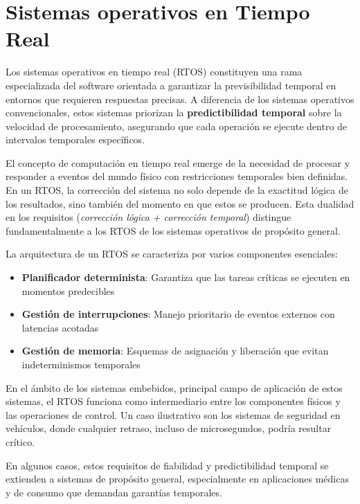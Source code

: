 \chapter{Sistemas operativos en Tiempo Real}\label{ch:real_time_oses}

Los sistemas operativos en tiempo real (RTOS) \cite{Siewert_Pratt_2016} constituyen una rama especializada del software orientada a garantizar la previsibilidad temporal en entornos que requieren respuestas precisas. A diferencia de los sistemas operativos convencionales, estos sistemas priorizan la \textbf{predictibilidad temporal} sobre la velocidad de procesamiento, asegurando que cada operación se ejecute dentro de intervalos temporales específicos.

El concepto de computación en tiempo real emerge de la necesidad de procesar y responder a eventos del mundo físico con restricciones temporales bien definidas. En un RTOS, la corrección del sistema no solo depende de la exactitud lógica de los resultados, sino también del momento en que estos se producen. Esta dualidad en los requisitos (\textit{corrección lógica + corrección temporal}) distingue fundamentalmente a los RTOS de los sistemas operativos de propósito general.

La arquitectura de un RTOS se caracteriza por varios componentes esenciales:

\begin{itemize}
    \item \textbf{Planificador determinista}: Garantiza que las tareas críticas se ejecuten en momentos predecibles
    \item \textbf{Gestión de interrupciones}: Manejo prioritario de eventos externos con latencias acotadas
    \item \textbf{Gestión de memoria}: Esquemas de asignación y liberación que evitan indeterminismos temporales
\end{itemize}

En el ámbito de los sistemas embebidos, principal campo de aplicación de estos sistemas, el RTOS funciona como intermediario entre los componentes físicos y las operaciones de control. Un caso ilustrativo son los sistemas de seguridad en vehículos, donde cualquier retraso, incluso de microsegundos, podría resultar crítico. 

En algunos casos, estos requisitos de fiabilidad y predictibilidad temporal se extienden a sistemas de propósito general, especialmente en aplicaciones médicas y de consumo que demandan garantías temporales. 

